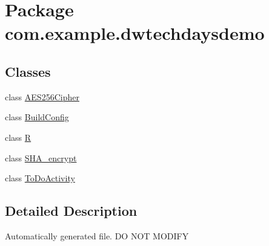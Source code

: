 \hypertarget{a00441}{}\section{Package com.\+example.\+dwtechdaysdemo}
\label{a00441}
\subsection*{Classes}
\begin{DoxyCompactItemize}
\item 
class \hyperlink{a00014}{A\+E\+S256\+Cipher}
\item 
class \hyperlink{a00021}{Build\+Config}
\item 
class \hyperlink{a00171}{R}
\item 
class \hyperlink{a00181}{S\+H\+A\+\_\+encrypt}
\item 
class \hyperlink{a00186}{To\+Do\+Activity}
\end{DoxyCompactItemize}


\subsection{Detailed Description}
Automatically generated file. DO N\+OT M\+O\+D\+I\+FY 